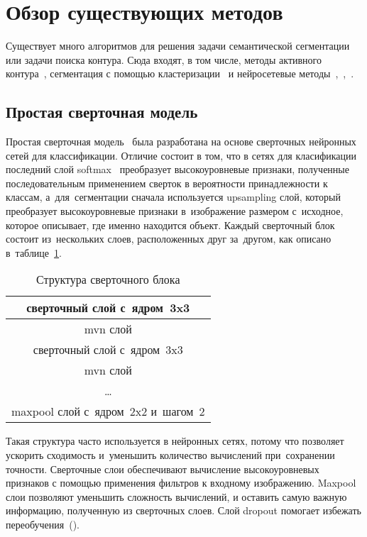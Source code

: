 \section{Обзор существующих методов}

Существует много алгоритмов для решения задачи семантической сегментации или задачи поиска контура. Сюда входят, в том числе, методы активного контура~\cite{snakes}, сегментация с помощью кластеризации~\cite{clustering_segm} и нейросетевые методы~\cite{fcn},~\cite{unet},~\cite{gridnet}.

\subsection{Простая сверточная модель}

Простая сверточная модель~\cite{fcn_1_layer_upsample} была разработана на основе сверточных нейронных сетей для классификации. Отличие состоит в том, что в сетях для класификации последний слой softmax~\cite{classification_loss} преобразует высокоуровневые признаки, полученные последовательным применением сверток в вероятности принадлежности к классам, а~для~сегментации сначала используется upsampling слой, который преобразует высокоуровневые признаки в~изображение размером с~исходное, которое описывает, где именно находится объект. Каждый сверточный блок состоит из~нескольких слоев, расположенных друг за~другом, как описано в~таблице~\ref{tab:conv_block}.

\begin{table}[b]
  \begin{center}
    \begin{tabular}{ c }
      \hline
      сверточный слой с~ядром~3x3           \\ \hline
      mvn слой                              \\ \hline
      сверточный слой с~ядром~3x3           \\ \hline
      mvn слой                              \\ \hline
      \dots                                 \\ \hline
      maxpool слой с~ядром~2x2 и~шагом~2    \\ 
      \hline
    \end{tabular}
    \caption{Структура сверточного блока} \label{tab:conv_block}
  \end{center}
\end{table}

Такая структура часто используется в нейронных сетях, потому что позволяет ускорить сходимость и~уменьшить количество вычислений при~сохранении точности. Сверточные слои обеспечивают вычисление высокоуровневых признаков с помощью применения фильтров к входному изображению. Maxpool слои позволяют уменьшить сложность вычислений, и оставить самую важную информацию, полученную из сверточных слоев. Слой dropout помогает избежать переобучения~(\cite{dropout}). 


